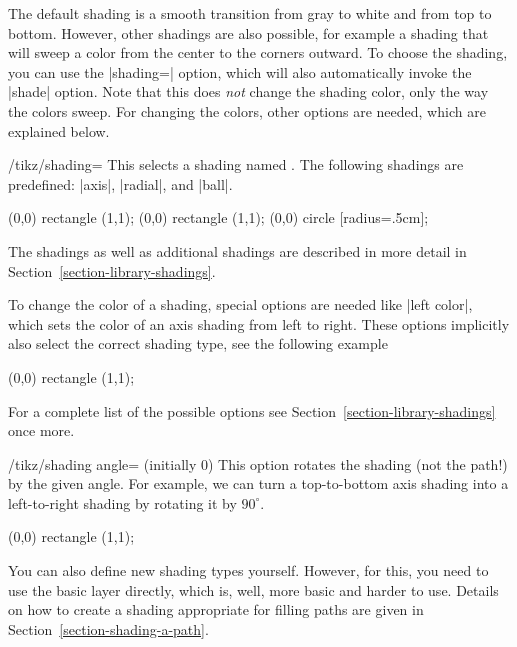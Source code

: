 The default shading is a smooth transition from gray to white and from top to
bottom. However, other shadings are also possible, for example a shading that
will sweep a color from the center to the corners outward. To choose the
shading, you can use the |shading=| option, which will also automatically
invoke the |shade| option. Note that this does \emph{not} change the shading
color, only the way the colors sweep. For changing the colors, other options
are needed, which are explained below.

\begin{key}{/tikz/shading=}
    This selects a shading named . The following shadings are
    predefined: |axis|, |radial|, and |ball|.
\begin{codeexample}[]
\tikz \shadedraw [shading=axis] (0,0) rectangle (1,1);
\tikz \shadedraw [shading=radial] (0,0) rectangle (1,1);
\tikz \shadedraw [shading=ball] (0,0) circle [radius=.5cm];
\end{codeexample}

    The shadings as well as additional shadings are described in more detail in
    Section~\ref{section-library-shadings}.

    To change the color of a shading, special options are needed like
    |left color|, which sets the color of an axis shading from left to right.
    These options implicitly also select the correct shading type, see the
    following example
\begin{codeexample}[]
\tikz \shadedraw [left color=red,right color=blue]
    (0,0) rectangle (1,1);
\end{codeexample}

    For a complete list of the possible options see
    Section~\ref{section-library-shadings} once more.

    \begin{key}{/tikz/shading angle= (initially 0)}
        This option rotates the shading (not the path!) by the given angle. For
        example, we can turn a top-to-bottom axis shading into a left-to-right
        shading by rotating it by $90^\circ$.
\begin{codeexample}[]
\tikz \shadedraw [shading=axis,shading angle=90] (0,0) rectangle (1,1);
\end{codeexample}
    \end{key}
\end{key}

You can also define new shading types yourself. However, for this, you need to
use the basic layer directly, which is, well, more basic and harder to use.
Details on how to create a shading appropriate for filling paths are given in
Section~\ref{section-shading-a-path}.


